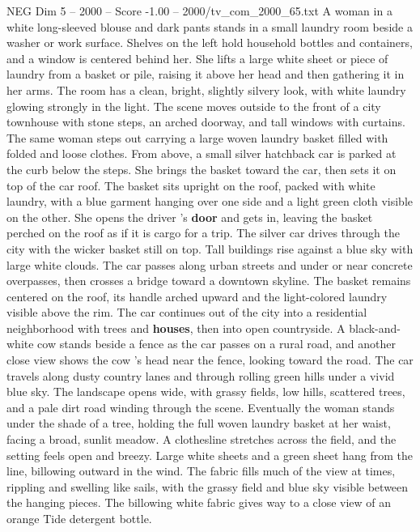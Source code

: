 \begin{textsample}{NEG Dim 5 – 2000 – Score -1.00 – 2000/tv\_com\_2000\_65.txt}  \label{ex:f5_neg_078}
A woman in a white long-sleeved blouse and dark pants stands in a small laundry room beside a washer or work surface.
Shelves on the left hold household bottles and containers, and a window is centered behind her.
She lifts a large white sheet or piece of laundry from a basket or pile, raising it above her head and then gathering it in her arms.
The room has a clean, bright, slightly silvery look, with white laundry glowing strongly in the light.
The scene moves outside to the front of a city townhouse with stone steps, an arched doorway, and tall windows with curtains.
The same woman steps out carrying a large woven laundry basket filled with folded and loose clothes.
From above, a small silver hatchback car is parked at the curb below the steps.
She brings the basket toward the car, then sets it on top of the car roof.
The basket sits upright on the roof, packed with white laundry, with a blue garment hanging over one side and a light green cloth visible on the other.
She opens the driver ’s \textbf{door} and gets in, leaving the basket perched on the roof as if it is cargo for a trip.
The silver car drives through the city with the wicker basket still on top.
Tall buildings rise against a blue sky with large white clouds.
The car passes along urban streets and under or near concrete overpasses, then crosses a bridge toward a downtown skyline.
The basket remains centered on the roof, its handle arched upward and the light-colored laundry visible above the rim.
The car continues out of the city into a residential neighborhood with trees and \textbf{houses}, then into open countryside.
A black-and-white cow stands beside a fence as the car passes on a rural road, and another close view shows the cow ’s head near the fence, looking toward the road.
The car travels along dusty country lanes and through rolling green hills under a vivid blue sky.
The landscape opens wide, with grassy fields, low hills, scattered trees, and a pale dirt road winding through the scene.
Eventually the woman stands under the shade of a tree, holding the full woven laundry basket at her waist, facing a broad, sunlit meadow.
A clothesline stretches across the field, and the setting feels open and breezy.
Large white sheets and a green sheet hang from the line, billowing outward in the wind.
The fabric fills much of the view at times, rippling and swelling like sails, with the grassy field and blue sky visible between the hanging pieces.
The billowing white fabric gives way to a close view of an orange Tide detergent bottle.

\end{textsample}
